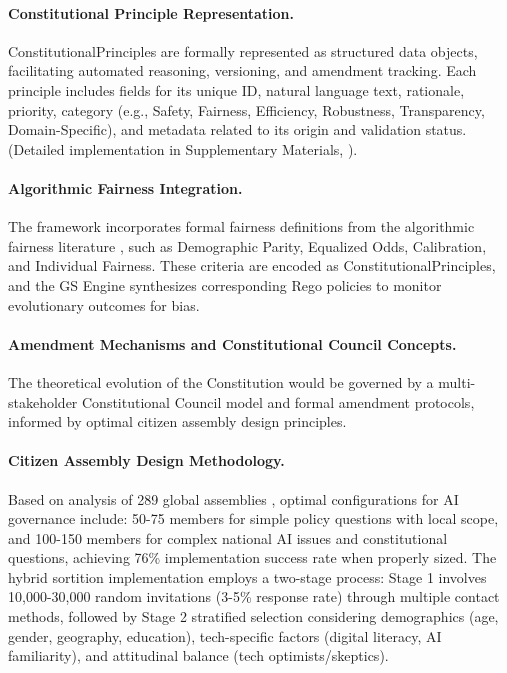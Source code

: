 \documentclass[manuscript,screen,9pt]{acmart}
\begin{document}
\begin{table}[!htb]
\paragraph{Constitutional Principle Representation.} ConstitutionalPrinciples are formally represented as structured data objects, facilitating automated reasoning, versioning, and amendment tracking. Each principle includes fields for its unique ID, natural language text, rationale, priority, category (e.g., Safety, Fairness, Efficiency, Robustness, Transparency, Domain-Specific), and metadata related to its origin and validation status. (Detailed implementation in Supplementary Materials, ).

\paragraph{Algorithmic Fairness Integration.} The framework incorporates formal fairness definitions from the algorithmic fairness literature \cite{Barocas2023FairnessML, Hardt2016EqualityOpportunity, Chouldechova2017FairPrediction, Dwork2012DifferentialPrivacy}, such as Demographic Parity, Equalized Odds, Calibration, and Individual Fairness. These criteria are encoded as ConstitutionalPrinciples, and the GS Engine synthesizes corresponding Rego policies to monitor evolutionary outcomes for bias.

\paragraph{Amendment Mechanisms and Constitutional Council Concepts.} The theoretical evolution of the Constitution would be governed by a multi-stakeholder Constitutional Council model and formal amendment protocols, informed by optimal citizen assembly design principles.

\paragraph{Citizen Assembly Design Methodology.} Based on analysis of 289 global assemblies \cite{OECD2020CitizenParticipation}, optimal configurations for AI governance include: 50-75 members for simple policy questions with local scope, and 100-150 members for complex national AI issues and constitutional questions, achieving 76\% implementation success rate when properly sized. The hybrid sortition implementation employs a two-stage process: Stage 1 involves 10,000-30,000 random invitations (3-5\% response rate) through multiple contact methods, followed by Stage 2 stratified selection considering demographics (age, gender, geography, education), tech-specific factors (digital literacy, AI familiarity), and attitudinal balance (tech optimists/skeptics).


\end{table}
\end{document}
